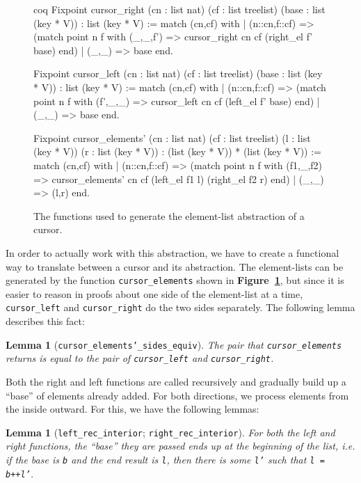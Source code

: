 \documentclass[12pt]{article}
\newtheorem{lemma}[theorem]{Lemma}
\begin{document}
\begin{singlespace}
\begin{figure}[ht]
\centering
\begin{cminted}{coq}
Fixpoint cursor_right (cn : list nat) (cf : list treelist)
  (base : list (key * V)) : list (key * V) :=
  match (cn,cf) with
  | (n::cn,f::cf) =>
    (match point n f with (_,_,f') =>
    cursor_right cn cf (right_el f' base) end)
  | (_,_) => base
  end.

Fixpoint cursor_left (cn : list nat) (cf : list treelist)
  (base : list (key * V)) : list (key * V) :=
  match (cn,cf) with
  | (n::cn,f::cf) =>
    (match point n f with (f',_,_) =>
    cursor_left cn cf (left_el f' base) end)
  | (_,_) => base
  end.

Fixpoint cursor_elements' (cn : list nat) (cf : list treelist)
  (l : list (key * V)) (r : list (key * V))
  : (list (key * V)) * (list (key * V)) :=
  match (cn,cf) with
  | (n::cn,f::cf) =>
    (match point n f with (f1,_,f2) =>
    cursor_elements' cn cf (left_el f1 l) (right_el f2 r) end)
  | (_,_) => (l,r)
  end.
\end{cminted}
\caption{The functions used to generate the element-list abstraction of a cursor.}
\label{fig:el}
\end{figure}
\end{singlespace}

In order to actually work with this abstraction, we have to create a functional way to translate between a cursor and its abstraction. The element-lists can be generated by the function \texttt{cursor\_elements} shown in \textbf{Figure~\ref{fig:el}}, but since it is easier to reason in proofs about one side of the element-list at a time, \texttt{cursor\_left} and \texttt{cursor\_right} do the two sides separately. The following lemma describes this fact:

\begin{lemma}[\texttt{cursor\_elements'\_sides\_equiv}]
The pair that \texttt{cursor\_elements} returns is equal to the pair of \texttt{cursor\_left} and \texttt{cursor\_right}.
\end{lemma}

Both the right and left functions are called recursively and gradually build up a ``base'' of elements already added. For both directions, we process elements from the inside outward. For this, we have the following lemmas:

\begin{lemma}[\texttt{left\_rec\_interior}; \texttt{right\_rec\_interior}]
For both the left and right functions, the ``base'' they are passed ends up at the beginning of the list, i.e. if the base is \texttt{b} and the end result is \texttt{l}, then there is some \texttt{l'} such that \texttt{l = b++l'}.
\end{lemma}
\end{document}
